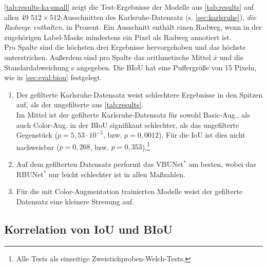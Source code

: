 \autoref{tab:results-ka-small} zeigt die Test-Ergebnisse der Modelle aus \autoref{tab:results} 
auf allen 49 $512{\times}512$-Ausschnitten des Karlsruhe-Datensatz (s. \autoref{sec:karlsruhe}), 
\textit{die Radwege enthalten}, in Prozent. 
Ein Ausschnitt enthält einen Radweg, wenn in der zugehörigen Label-Maske mindestens ein Pixel als Radweg annotiert ist. \\
Pro Spalte sind die höchsten drei Ergebnisse hervorgehoben und das höchste unterstrichen.
Außerdem sind pro Spalte das arithmetische Mittel $\bar{x}$ und die Standardabweichung s angegeben. 
Die \ac{BIoU} hat eine Puffergröße von 15 Pixeln, wie in \autoref{sec:eval:biou} festgelegt.
\begin{enumerate}
	\item Der gefilterte Karlsruhe-Datensatz weist schlechtere Ergebnisse in den Spitzen auf, 
	als der ungefilterte aus \autoref{tab:results}. \\
	Im Mittel ist der gefilterte Karlsruhe-Datensatz für sowohl Basic-Aug., als auch Color-Aug. in der BIoU  
	signifikant schlechter, als das ungefilterte Gegenstück ($p = 5,53 \cdot 10^{-5}$, bzw. $p = 0,0012$). 
	Für die IoU ist dies nicht nachweisbar ($p = 0,268$, bzw. $p = 0,353$).\footnote{Alle Tests als einseitige Zweistichproben-Welch-Tests.}    
	\item Auf dem gefilterten Datensatz performt das VBUNet$^*$ am besten, wobei das RBUNet$^*$ nur leicht schlechter ist in allen Maßzahlen.
	\item Für die mit Color-Augmentation trainierten Modelle weist der gefilterte Datensatz eine kleinere Streuung auf. 
\end{enumerate}

\subsection{Korrelation von IoU und BIoU}

